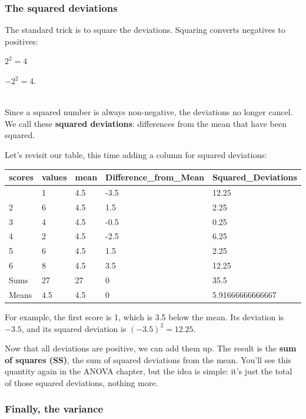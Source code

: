 \documentclass[
  letterpaper,
  DIV=11,
  numbers=noendperiod]{scrreprt}
\begin{document}
\subsubsection{The squared deviations}\label{the-squared-deviations}

The standard trick is to square the deviations. Squaring converts
negatives to positives:

\(2^2 = 4\)

\(-2^2 = 4\).\\
\strut \\
Since a squared number is always non-negative, the deviations no longer
cancel. We call these \textbf{squared deviations}: differences from the
mean that have been squared.

Let's revisit our table, this time adding a column for squared
deviations:

\begin{longtable}[]{@{}lllll@{}}
\toprule\noalign{}
scores & values & mean & Difference\_from\_Mean & Squared\_Deviations \\
\midrule\noalign{}
\endhead
\bottomrule\noalign{}
\endlastfoot
1 & 1 & 4.5 & -3.5 & 12.25 \\
2 & 6 & 4.5 & 1.5 & 2.25 \\
3 & 4 & 4.5 & -0.5 & 0.25 \\
4 & 2 & 4.5 & -2.5 & 6.25 \\
5 & 6 & 4.5 & 1.5 & 2.25 \\
6 & 8 & 4.5 & 3.5 & 12.25 \\
Sums & 27 & 27 & 0 & 35.5 \\
Means & 4.5 & 4.5 & 0 & 5.91666666666667 \\
\end{longtable}

For example, the first score is 1, which is 3.5 below the mean. Its
deviation is \(−3.5\), and its squared deviation is \((−3.5)^2=12.25\).

Now that all deviations are positive, we can add them up. The result is
the \textbf{sum of squares (SS)}, the sum of squared deviations from the
mean. You'll see this quantity again in the ANOVA chapter, but the idea
is simple: it's just the total of those squared deviations, nothing
more.

\subsubsection{Finally, the variance}\label{finally-the-variance}
\end{document}
